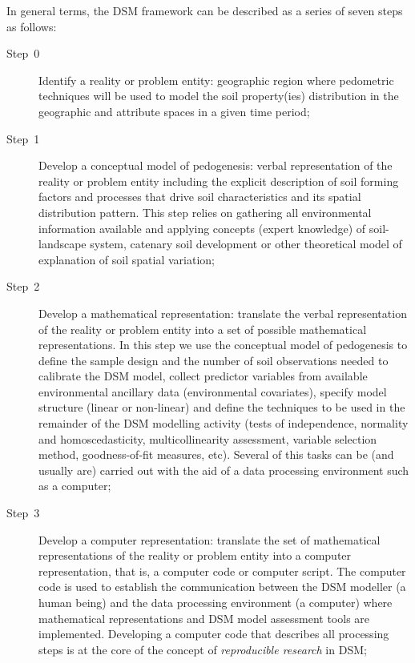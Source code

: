 In general terms, the DSM framework can be described as a series of seven steps 
as follows:

\begin{description}
  \item [{Step~0}] Identify a reality or problem entity: geographic region where
  pedometric techniques will be used to model the soil property(ies) distribution
  in the geographic and attribute spaces in a given time period;

  \item [{Step~1}] Develop a conceptual model of pedogenesis: verbal 
  representation of the reality or problem entity including the explicit 
  description of soil forming factors and processes that drive soil 
  characteristics and its spatial distribution pattern. This step relies on 
  gathering all environmental information available and applying concepts 
  (expert knowledge) of soil-landscape system, catenary soil development or 
  other theoretical model of explanation of soil spatial variation;

  \item [{Step~2}] Develop a mathematical representation: translate the verbal 
  representation of the reality or problem entity into a set of possible 
  mathematical representations. In this step we use the conceptual model of 
  pedogenesis to define the sample design and the number of soil observations 
  needed to calibrate the DSM model, collect predictor variables from available 
  environmental ancillary data (environmental covariates), specify model 
  structure (linear or non-linear) and define the techniques to be used in the 
  remainder of the DSM modelling activity (tests of independence, normality and 
  homoscedasticity, multicollinearity assessment, variable selection method, 
  goodness-of-fit measures, etc). Several of this tasks can be (and usually are)
  carried out with the aid of a data processing environment such as a computer;

  \item [{Step~3}] Develop a computer representation: translate the set of 
  mathematical representations of the reality or problem entity into a computer 
  representation, that is, a computer code or computer script. The computer 
  code is used to establish the communication between the DSM modeller (a human 
  being) and the data processing environment (a computer) where mathematical 
  representations and DSM model assessment tools are implemented. Developing a 
  computer code that describes all processing steps is at the core of the 
  concept of \textit{reproducible research} in DSM;


\end{description}
